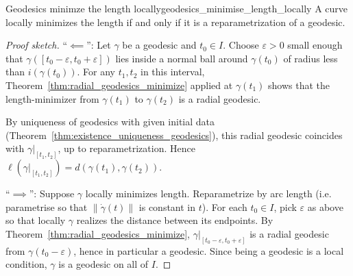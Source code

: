\begin{colorcor}{Geodesics minimze the length locally}{geodesics_minimise_length_locally}
A curve locally minimizes the length if and only if it is a reparametrization of a geodesic.
\end{colorcor}

\begin{proof}[Proof sketch]
``$\impliedby$'': Let $\gamma$ be a geodesic and $t_0 \in I$. Choose $\varepsilon > 0$ small enough that $\gamma([t_0 - \varepsilon, t_0 + \varepsilon])$ lies inside a normal ball around $\gamma(t_0)$ of radius less than $i(\gamma(t_0))$. For any $t_1, t_2$ in this interval, Theorem~\ref{thm:radial_geodesics_minimize} applied at $\gamma(t_1)$ shows that the length-minimizer from $\gamma(t_1)$ to $\gamma(t_2)$ is a radial geodesic. 

By uniqueness of geodesics with given initial data (Theorem~\ref{thm:existence_uniqueness_geodesics}), this radial geodesic coincides with $\gamma|_{[t_1, t_2]}$, up to reparametrization. Hence $\ell(\gamma|_{[t_1, t_2]}) = d(\gamma(t_1), \gamma(t_2))$.

``$\implies$'': Suppose $\gamma$ locally minimizes length. Reparametrize by arc length (i.e. parametrise so that $\left\lVert \dot\gamma(t) \right\rVert$ is constant in $t$). For each $t_0 \in I$, pick $\varepsilon$ as above so that locally $\gamma$ realizes the distance between its endpoints. By Theorem~\ref{thm:radial_geodesics_minimize}, $\gamma|_{[t_0 - \varepsilon, t_0 + \varepsilon]}$ is a radial geodesic from $\gamma(t_0 - \varepsilon)$, hence in particular a geodesic. Since being a geodesic is a local condition, $\gamma$ is a geodesic on all of $I$.
\end{proof}




